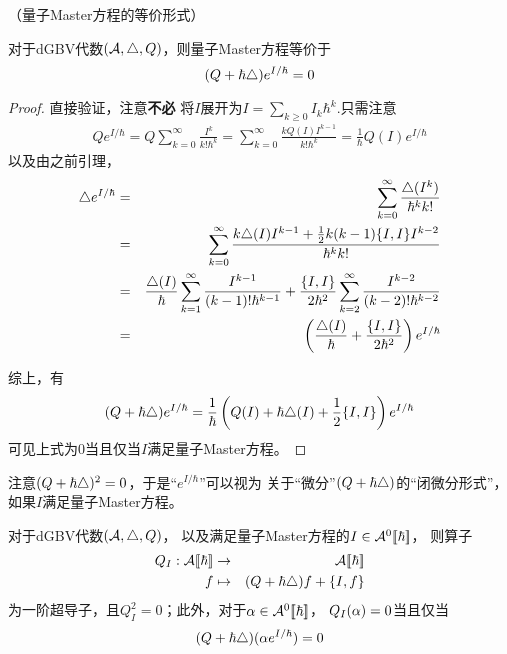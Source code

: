 \begin{prop}（量子Master方程的等价形式）

对于dGBV代数$(\mathcal{A},\triangle,Q)$，则量子Master方程等价于
$$(Q+\hbar\triangle)e^{I/\hbar}=0$$
\end{prop}

\begin{proof}直接验证，注意\textbf{不必}
将$I$展开为$I=\sum\nolimits_{k\geq 0}I_k\hbar^k$.只需注意
\begin{eqnarray*}
     Qe^{I/\hbar}
 =
     Q\sum_{k=0}^\infty
        \frac{I^k}
             {k!\hbar^k}
 =
     \sum_{k=0}^\infty
       \frac{kQ(I)I^{k-1}}
            {k!\hbar^k}
 =
     \frac{1}{\hbar}
     Q(I)e^{I/\hbar}
\end{eqnarray*}
以及由之前引理，
\begin{eqnarray*}
     \triangle e^{I/\hbar}
&=&
     \sum_{k=0}^\infty
       \frac{\triangle(I^k)}{\hbar^kk!}\\
&=&
     \sum_{k=0}^\infty
       \frac{
              k\triangle(I)I^{k-1}
             +\frac{1}{2}k(k-1)\{I,I\}I^{k-2}
            }
            {\hbar^kk!}\\
&=&
     \frac{\triangle(I)}{\hbar}
     \sum_{k=1}^\infty
       \frac{I^{k-1}}{(k-1)!\hbar^{k-1}}
    +\frac{\{I,I\}}{2\hbar^2}
     \sum_{k=2}^\infty
       \frac{I^{k-2}}{(k-2)!\hbar^{k-2}}\\
&=&
     \left(
       \frac{\triangle(I)}{\hbar}
      +\frac{\{I,I\}}{2\hbar^2}
     \right)
     e^{I/\hbar}
\end{eqnarray*}

综上，有
$$
  (Q+\hbar\triangle)e^{I/\hbar}
=\frac{1}{\hbar}
 \left(
   Q(I)+\hbar\triangle(I)+\frac{1}{2}\{I,I\}
 \right)
 e^{I/\hbar}
$$
可见上式为$0$当且仅当$I$满足量子Master方程。
\end{proof}

注意$(Q+\hbar\triangle)^2=0$，于是“$e^{I/\hbar}$”可以视为
关于“微分”$(Q+\hbar\triangle)$的“闭微分形式”，
如果$I$满足量子Master方程。


\begin{prop}
对于dGBV代数$(\mathcal{A},\triangle,Q)$，
以及满足量子Master方程的$I\in\mathcal{A}^0[\![\hbar]\!]$，
则算子
\begin{eqnarray*}
Q_I:\mathcal{A}[\![\hbar]\!]&\to&\mathcal{A}[\![\hbar]\!]\\
f&\mapsto&(Q+\hbar\triangle)f+\{I,f\}
\end{eqnarray*}
为一阶超导子，且$Q_I^2=0$；此外，对于$\alpha\in\mathcal{A}^0[\![\hbar]\!]$，
$Q_I(\alpha)=0$当且仅当
$$(Q+\hbar\triangle)(\alpha e^{I/\hbar})=0$$
\end{prop}

